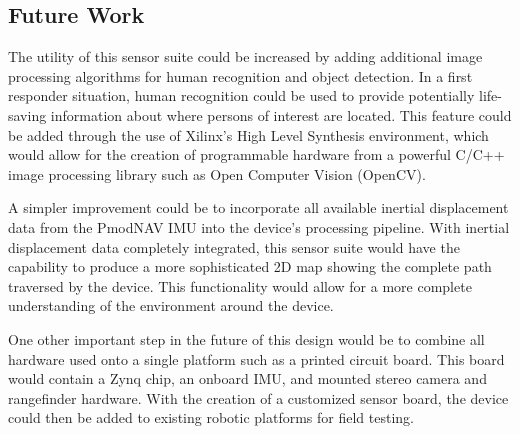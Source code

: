 \subsection{Future Work}
The utility of this sensor suite could be increased by adding additional image processing algorithms for human recognition and object detection.  In a first responder situation, human recognition could be used to provide potentially life-saving information about where persons of interest are located. This feature could be added through the use of Xilinx's High Level Synthesis environment, which would allow for the creation of programmable hardware from a powerful C/C++ image processing library such as Open Computer Vision (OpenCV).
\par
A simpler improvement could be to incorporate all available inertial displacement data from the PmodNAV IMU into the device's processing pipeline. With inertial displacement data completely integrated, this sensor suite would have the capability to produce a more sophisticated 2D map showing the complete path traversed by the device. This functionality would allow for a more complete understanding of the environment around the device.
\par
One other important step in the future of this design would be to combine all hardware used onto a single platform such as a printed circuit board. This board would contain a Zynq chip, an onboard IMU, and mounted stereo camera and rangefinder hardware. With the creation of a customized sensor board, the device could then be added to existing robotic platforms for field testing. 



